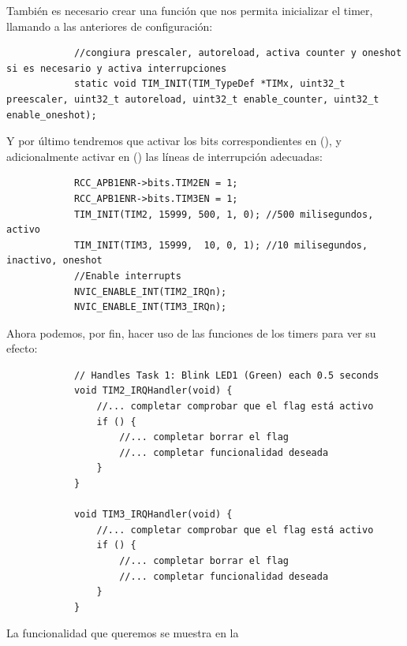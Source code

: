 \documentclass[../main.tex]{subfiles}
\begin{document}
        También es necesario crear una función que nos permita inicializar el timer, llamando a las anteriores de configuración:

        \begin{lstlisting}
            //congiura prescaler, autoreload, activa counter y oneshot si es necesario y activa interrupciones
            static void TIM_INIT(TIM_TypeDef *TIMx, uint32_t preescaler, uint32_t autoreload, uint32_t enable_counter, uint32_t enable_oneshot);
        \end{lstlisting}
        
        Y por último tendremos que activar los bits correspondientes en  (\REFMAN[5.3.13]), y adicionalmente activar en  (\REFMAN[9.1.12]) las líneas de interrupción adecuadas:

        \begin{lstlisting}
            RCC_APB1ENR->bits.TIM2EN = 1;
            RCC_APB1ENR->bits.TIM3EN = 1;
            TIM_INIT(TIM2, 15999, 500, 1, 0); //500 milisegundos, activo
            TIM_INIT(TIM3, 15999,  10, 0, 1); //10 milisegundos, inactivo, oneshot
            //Enable interrupts
            NVIC_ENABLE_INT(TIM2_IRQn);
            NVIC_ENABLE_INT(TIM3_IRQn);
        \end{lstlisting}

        Ahora podemos, por fin, hacer uso de las funciones de los timers para ver su efecto:

        \begin{lstlisting}
            // Handles Task 1: Blink LED1 (Green) each 0.5 seconds
            void TIM2_IRQHandler(void) {
                //... completar comprobar que el flag está activo
                if () {
                    //... completar borrar el flag
                    //... completar funcionalidad deseada
                }
            }

            void TIM3_IRQHandler(void) {
                //... completar comprobar que el flag está activo
                if () {
                    //... completar borrar el flag
                    //... completar funcionalidad deseada
                }
            }
        \end{lstlisting}

        La funcionalidad que queremos se muestra en la 
\end{document}
